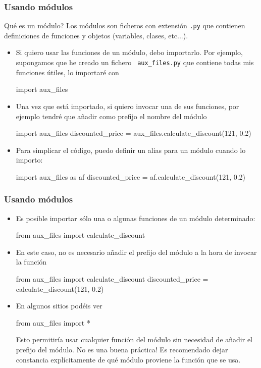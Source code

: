 \documentclass[handout,9pt]{beamer}
\begin{document}
\begin{frame}[fragile]
  \frametitle{Usando módulos}
  \begin{block}{Qué es un módulo?}
    Los módulos son ficheros con extensión {\tt .py} que contienen
    definiciones de funciones y objetos (variables, clases, etc...).
  \end{block}
  \begin{itemize}
  \item<2-> Si quiero usar las funciones de un módulo, debo
    importarlo. Por ejemplo, supongamos que he creado un fichero {\tt
      aux\_files.py} que contiene todas mis funciones útiles, lo
    importaré con 
    \begin{pyverbatim}
import aux_files
    \end{pyverbatim}
  \item<3-> Una vez que   está importado, si quiero
    invocar una de sus funciones, por ejemplo  tendré que añadir como prefijo el
    nombre del módulo
    \begin{pyverbatim}
import aux_files
discounted_price = aux_files.calculate_discount(121, 0.2)      
    \end{pyverbatim}
  \item<4-> Para simplicar el código, puedo definir un alias para un
    módulo cuando lo importo:
        \begin{pyverbatim}
import aux_files as af
discounted_price = af.calculate_discount(121, 0.2)      
    \end{pyverbatim}
  \end{itemize}
\end{frame}

\begin{frame}[fragile]
  \frametitle{Usando módulos}
  \begin{itemize}
  \item<1-> Es posible importar sólo una o algunas funciones de un
    módulo determinado: 
    \begin{pyverbatim}
from aux_files import calculate_discount
    \end{pyverbatim}
  \item<2-> En este caso, no es necesario añadir el prefijo del módulo
    a la hora de invocar la función
    \begin{pyverbatim}
from aux_files import calculate_discount
discounted_price = calculate_discount(121, 0.2)      
    \end{pyverbatim}
  \item<3-> En algunos sitios podéis ver
        \begin{pyverbatim}
from aux_files import *
\end{pyverbatim}
Esto permitiría usar cualquier función del módulo  sin
necesidad de añadir el prefijo del módulo. No es una buena práctica!
Es recomendado dejar constancia explícitamente de qué módulo proviene
la función que se usa.
  \end{itemize}
\end{frame}
\end{document}

